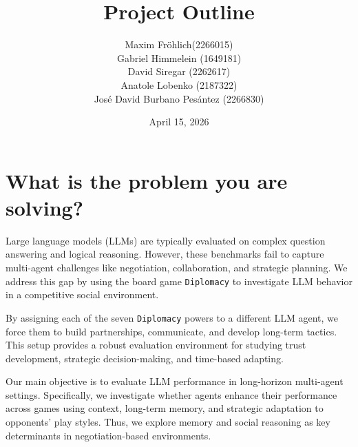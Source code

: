 \documentclass[a4paper,oneside,bibliography=totoc]{scrbook}
\begin{document}
\makeatletter
\renewcommand\thesection{\arabic{section}}
\renewcommand\thesubsection{\arabic{section}.\arabic{subsection}}
\renewcommand\thesubsubsection{\arabic{section}.\arabic{subsection}.\arabic{subsubsection}}
\makeatother



\frontmatter \subject{Multi-Agent Gaming \\with the Board Game Diplomacy} %
\title{Project Outline}
\author{
  Maxim Fröhlich(2266015)\\
  Gabriel Himmelein (1649181)\\
  David Siregar (2262617)\\
  Anatole Lobenko (2187322)\\
  José David Burbano Pesántez (2266830)
} \date{April 15, 2026}
\publishers{{\small Submitted to}\\
  Data and Web Science Group\\
  Dr. Ralph Peters\\
  Prof. Dr. Christian Bizer\\
  University of Mannheim\\}
\maketitle


\section{What is the problem you are solving?}
Large language models (LLMs) are typically evaluated on complex question answering and logical reasoning. However, these benchmarks fail to capture multi-agent challenges like negotiation, collaboration, and strategic planning. We address this gap by using the board game \texttt{Diplomacy} to investigate LLM behavior in a competitive social environment.

By assigning each of the seven \texttt{Diplomacy} powers to a different LLM agent, we force them to build partnerships, communicate, and develop long-term tactics. This setup provides a robust evaluation environment for studying trust development, strategic decision-making, and time-based adapting.

Our main objective is to evaluate LLM performance in long-horizon multi-agent settings. Specifically, we investigate whether agents enhance their performance across games using context, long-term memory, and strategic adaptation to opponents' play styles. Thus, we explore memory and social reasoning as key determinants in negotiation-based environments.
\end{document}
